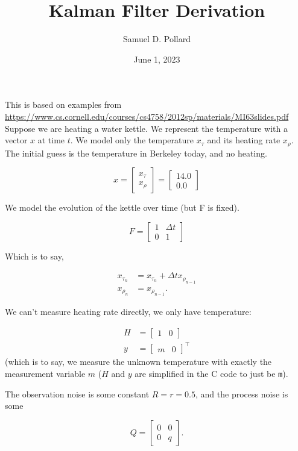 \documentclass[11pt]{article}
\title{Kalman Filter Derivation}
\author{Samuel D. Pollard}
\date{June 1, 2023}
\begin{document}
\maketitle	

This is based on examples from \url{https://www.cs.cornell.edu/courses/cs4758/2012sp/materials/MI63slides.pdf}
Suppose we are heating a water kettle. We represent the temperature with a vector $x$ at time $t$. We model only the temperature $x_\tau$ and its heating rate $x_\rho$. The initial guess is the temperature in Berkeley today, and no heating.

\[
	x = \begin{bmatrix} x_\tau \\ x_\rho \end{bmatrix} = \begin{bmatrix} 14.0 \\ 0.0  \end{bmatrix}
\]

We model the evolution of the kettle over time (but F is fixed).

\[
	F = \begin{bmatrix} 1 & \Delta t \\ 0 & 1 \end{bmatrix}
\]

Which is to say,

\begin{align*}
	x_{\tau_n} &= x_{\tau_n} + \Delta t x_{\rho_{n-1}}  \\
	x_{\rho_n} &= x_{\rho_{n-1}}.
\end{align*}

We can't measure heating rate directly, we only have temperature:

\begin{align*}
	H &= \begin{bmatrix} 1 & 0 \end{bmatrix} \\
	y &= \begin{bmatrix} m & 0 \end{bmatrix}^\top
\end{align*}
(which is to say, we measure the unknown temperature with exactly the measurement variable $m$ ($H$ and $y$ are simplified in the C code to just be \verb|m|).

The observation noise is some constant $R = r = 0.5$, and the process noise is some

\[
	Q = \begin{bmatrix} 0 & 0 \\ 0 & q \end{bmatrix}.
\]
\end{document}
